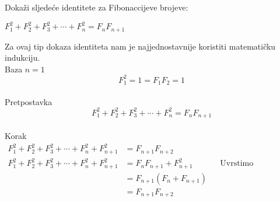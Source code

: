 \documentclass[exam.tex]{subfiles}
\begin{document}
	\begin{subtask}
		Dokaži sljedeće identitete za Fibonaccijeve brojeve:
	
		\( F^2_1 + F^2_2 + F^2_3 + \cdots + F^2_n = F_n F_{n + 1} \) \\
	\end{subtask}	
	
	Za ovaj tip dokaza identiteta nam je najjednostavnije koristiti matematičku indukciju. \\
	
	Baza \(n = 1\)
	\[ F^2_1 = 1 = F_1 F_2 = 1 \] \\
	
	Pretpostavka
	\[ F^2_1 + F^2_2 + F^2_3 + \cdots + F^2_n = F_n F_{n + 1} \] \\
	
	Korak
	\begin{align*}
		F^2_1 + F^2_2 + F^2_3 + \cdots + F^2_n + F^2_{n + 1} &= F_{n + 1} F_{n + 2} \\
		F^2_1 + F^2_2 + F^2_3 + \cdots + F^2_n + F^2_{n + 1} &= F_n F_{n + 1} + F^2_{n + 1} && \text{Uvrstimo pretpostavku} \\
		&= F_{n + 1} (F_n + F_{n + 1}) \\
		&= F_{n + 1} F_{n + 2}
	\end{align*}
\end{document}
